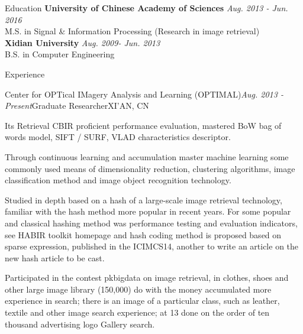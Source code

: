 \documentclass{resume} %
\begin{document}

\begin{rSection}{Education}
{\bf University of Chinese Academy of Sciences} \hfill {\em Aug. 2013 - Jun. 2016} \\
M.S. in  Signal \& Information Processing (Research in image retrieval)\\
{\bf Xidian University} \hfill {\em Aug. 2009- Jun. 2013} \\
B.S. in Computer Engineering
\end{rSection}


\begin{rSection}{Experience}

\begin{rSubsection}{Center for OPTical IMagery Analysis and Learning (OPTIMAL)}{\em Aug. 2013 - Present}{Graduate Researcher}{XI'AN, CN}
\item Its Retrieval CBIR proficient performance evaluation, mastered BoW bag of words model, SIFT / SURF, VLAD characteristics descriptor.
\item Through continuous learning and accumulation master machine learning some commonly used means of dimensionality reduction, clustering algorithms, image classification method and image object recognition technology.
\item Studied in depth based on a hash of a large-scale image retrieval technology, familiar with the hash method more popular in recent years. For some popular and classical hashing method was performance testing and evaluation indicators, see HABIR toolkit homepage and hash coding method is proposed based on sparse expression, published in the ICIMCS14, another to write an article on the new hash article to be cast.
\item Participated in the contest pkbigdata on image retrieval, in clothes, shoes and other large image library (150,000) do with the money accumulated more experience in search; there is an image of a particular class, such as leather, textile and other image search experience; at 13 done on the order of ten thousand advertising logo Gallery search.
\end{rSubsection}

\end{rSection}
\end{document}

